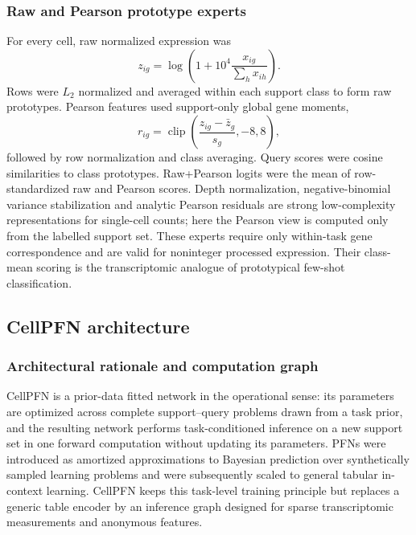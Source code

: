 \documentclass[12pt]{article}
\begin{document}
\subsubsection*{Raw and Pearson prototype experts}

For every cell, raw normalized expression was
\begin{equation}
z_{ig}=\log\left(1+10^4\frac{x_{ig}}{\sum_hx_{ih}}\right).
\end{equation}
Rows were $L_2$ normalized and averaged within each support class to form raw prototypes. Pearson features used support-only global gene moments,
\begin{equation}
r_{ig}=\operatorname{clip}\left(\frac{z_{ig}-\bar z_g}{s_g},-8,8\right),
\end{equation}
followed by row normalization and class averaging. Query scores were cosine similarities to class prototypes. Raw+Pearson logits were the mean of row-standardized raw and Pearson scores. Depth normalization, negative-binomial variance stabilization and analytic Pearson residuals are strong low-complexity representations for single-cell counts\cite{hafemeister2019sctransform,townes2019multinomial,lause2021pearson}; here the Pearson view is computed only from the labelled support set. These experts require only within-task gene correspondence and are valid for noninteger processed expression. Their class-mean scoring is the transcriptomic analogue of prototypical few-shot classification\cite{snell2017prototypical}.

\subsection*{CellPFN architecture}

\subsubsection*{Architectural rationale and computation graph}

CellPFN is a prior-data fitted network in the operational sense: its parameters are optimized across complete support--query problems drawn from a task prior, and the resulting network performs task-conditioned inference on a new support set in one forward computation without updating its parameters. PFNs were introduced as amortized approximations to Bayesian prediction over synthetically sampled learning problems and were subsequently scaled to general tabular in-context learning\cite{muller2022pfn,hollmann2025tabpfn,qu2026tabiclv2}. CellPFN keeps this task-level training principle but replaces a generic table encoder by an inference graph designed for sparse transcriptomic measurements and anonymous features.
\end{document}
